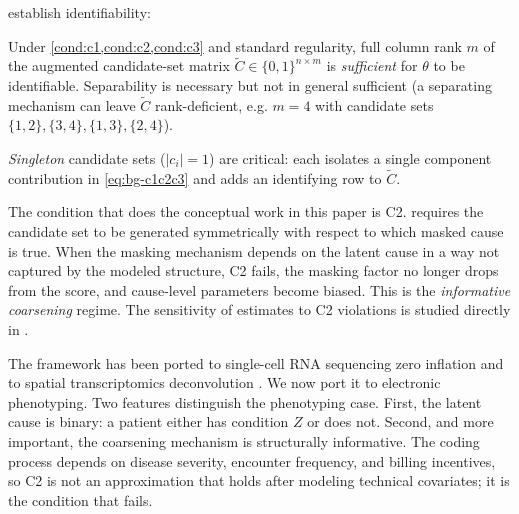 \citet[Theorem 8]{towell2026masked} establish identifiability:

\begin{theorem}
\label{thm:bg-id}
Under \cref{cond:c1,cond:c2,cond:c3} and standard regularity, full
column rank $m$ of the augmented candidate-set matrix $\tilde{C} \in
\{0,1\}^{n \times m}$ is \emph{sufficient} for $\theta$ to be
identifiable. Separability is necessary but not in general
sufficient (a separating mechanism can leave $\tilde{C}$
rank-deficient, e.g. $m=4$ with candidate sets
$\{1,2\},\{3,4\},\{1,3\},\{2,4\}$).
\end{theorem}

\emph{Singleton} candidate sets ($|c_i|=1$) are critical: each isolates
a single component contribution in \eqref{eq:bg-c1c2c3} and adds an
identifying row to $\tilde{C}$.

The condition that does the conceptual work in this paper is C2.
 requires the candidate set to be generated
symmetrically with respect to which masked cause is true. When the
masking mechanism depends on the latent cause in a way not captured by
the modeled structure, C2 fails, the masking factor no longer drops
from the score, and cause-level parameters become biased. This is the
\emph{informative coarsening} regime. The sensitivity of estimates to
C2 violations is studied directly in \citet{towell2026mdrelax}.

The framework has been ported to single-cell RNA sequencing zero
inflation \citep{towell2026scrnacoarsening} and to spatial
transcriptomics deconvolution \citep{towell2026spatialcoarsening}. We
now port it to electronic phenotyping. Two features distinguish the
phenotyping case. First, the latent cause is binary: a patient either
has condition $Z$ or does not. Second, and more important, the
coarsening mechanism is structurally informative. The coding process
depends on disease severity, encounter frequency, and billing
incentives, so C2 is not an approximation that holds after modeling
technical covariates; it is the condition that fails.
